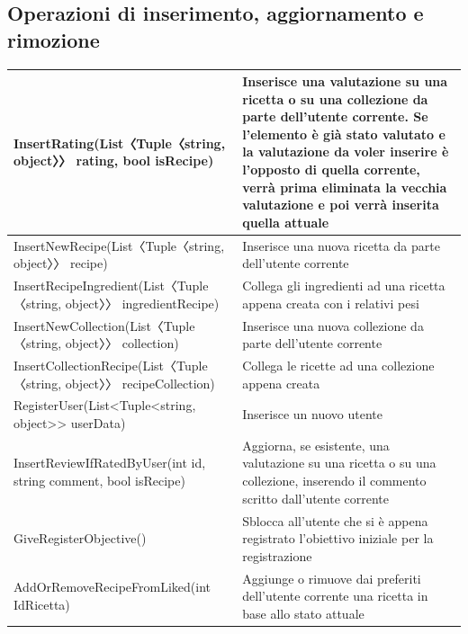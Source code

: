﻿\documentclass[a4paper,12pt]{report}
\begin{document}
\subsection{Operazioni di inserimento, aggiornamento e\\ rimozione}
\begin{table}[h!]
    \centering
    \begin{tabular}{ |p{3in}|p{2in}| }
        \hline
        \scriptsize{InsertRating(List〈Tuple〈string, object〉〉 rating, bool isRecipe)} & \scriptsize{Inserisce una valutazione su una ricetta o su una collezione da parte dell'utente corrente. Se l'elemento è già stato valutato e la valutazione da voler inserire è l'opposto di quella corrente, verrà prima eliminata la vecchia valutazione e poi verrà inserita quella attuale} \\
        \hline
        \scriptsize{InsertNewRecipe(List〈Tuple〈string, object〉〉 recipe)} & \scriptsize{Inserisce una nuova ricetta da parte dell'utente corrente} \\
        \hline
        \scriptsize{InsertRecipeIngredient(List〈Tuple〈string, object〉〉 ingredientRecipe)} & \scriptsize{Collega gli ingredienti ad una ricetta appena creata con i relativi pesi} \\
        \hline
        \scriptsize{InsertNewCollection(List〈Tuple〈string, object〉〉 collection)} & \scriptsize{Inserisce una nuova collezione da parte dell'utente corrente} \\
        \hline
        \scriptsize{InsertCollectionRecipe(List〈Tuple〈string, object〉〉 recipeCollection)} & \scriptsize{Collega le ricette ad una collezione appena creata} \\
        \hline
        \scriptsize{RegisterUser(List<Tuple<string, object>> userData)} & \scriptsize{Inserisce un nuovo utente} \\
        \hline
        \scriptsize{InsertReviewIfRatedByUser(int id, string comment, bool isRecipe)} & \scriptsize{Aggiorna, se esistente, una valutazione su una ricetta o su una collezione, inserendo il commento scritto dall'utente corrente} \\
        \hline
        \scriptsize{GiveRegisterObjective()} & \scriptsize{Sblocca all'utente che si è appena registrato l'obiettivo iniziale per la registrazione} \\
        \hline
        \scriptsize{AddOrRemoveRecipeFromLiked(int IdRicetta)} & \scriptsize{Aggiunge o rimuove dai preferiti dell'utente corrente una ricetta in base allo stato attuale} \\
        \hline
    \end{tabular}
\end{table}
\end{document}
